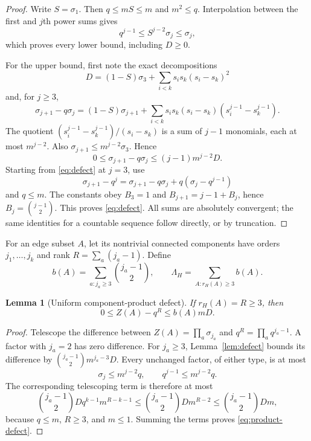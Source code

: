 \documentclass[11pt]{article}
\newtheorem{lemma}[theorem]{Lemma}
\begin{document}
\begin{proof}
Write $S=\sigma_1$.  Then $q\leq mS\leq m$ and $m^2\leq q$.
Interpolation between the first and $j$th power sums gives
\[
 q^{j-1}\leq S^{j-2}\sigma_j\leq\sigma_j,
\]
which proves every lower bound, including $D\geq0$.

For the upper bound, first note the exact decompositions
\[
 D=(1-S)\sigma_3+
 \sum_{i<k}s_i s_k(s_i-s_k)^2
\]
and, for $j\geq3$,
\[
 \sigma_{j+1}-q\sigma_j
 =(1-S)\sigma_{j+1}
 +\sum_{i<k}s_i s_k(s_i-s_k)
       (s_i^{j-1}-s_k^{j-1}).
\]
The quotient
$(s_i^{j-1}-s_k^{j-1})/(s_i-s_k)$ is a sum of $j-1$
monomials, each at most $m^{j-2}$.  Also
$\sigma_{j+1}\leq m^{j-2}\sigma_3$.  Hence
\begin{equation}
 0\leq\sigma_{j+1}-q\sigma_j
 \leq(j-1)m^{j-2}D.
 \label{eq:recurrence}
\end{equation}
Starting from \eqref{eq:defect} at $j=3$, use
\[
 \sigma_{j+1}-q^j
 =\sigma_{j+1}-q\sigma_j
  +q(\sigma_j-q^{j-1})
\]
and $q\leq m$.  The constants obey
$B_3=1$ and $B_{j+1}=j-1+B_j$, hence
$B_j=\binom{j-1}{2}$.  This proves \eqref{eq:defect}.
All sums are absolutely convergent; the same identities for a countable
sequence follow directly, or by truncation.
\end{proof}

For an edge subset $A$, let its nontrivial connected components have orders
$j_1,\ldots,j_k$ and rank $R=\sum_a(j_a-1)$.  Define
\[
 b(A)=\sum_{a:j_a\geq3}\binom{j_a-1}{2},
 \qquad
 \Lambda_H=\sum_{A:r_H(A)\geq3}b(A).
\]

\begin{lemma}[Uniform component-product defect]\label{lem:product-defect}
If $r_H(A)=R\geq3$, then
\begin{equation}
 0\leq Z(A)-q^R\leq b(A)mD.
 \label{eq:product-defect}
\end{equation}
\end{lemma}

\begin{proof}
Telescope the difference between
$Z(A)=\prod_a\sigma_{j_a}$ and
$q^R=\prod_a q^{j_a-1}$.  A factor with $j_a=2$ has zero difference.  For
$j_a\geq3$, Lemma~\ref{lem:defect} bounds its difference by
$\binom{j_a-1}{2}m^{j_a-3}D$.  Every unchanged factor, of either type,
is at most
\[
 \sigma_j\leq m^{j-2}q,
 \qquad q^{j-1}\leq m^{j-2}q.
\]
The corresponding telescoping term is therefore at most
\[
 \binom{j_a-1}{2}
 Dq^{k-1}m^{R-k-1}
 \leq \binom{j_a-1}{2}Dm^{R-2}
 \leq \binom{j_a-1}{2}Dm,
\]
because $q\leq m$, $R\geq3$, and $m\leq1$.  Summing the terms proves
\eqref{eq:product-defect}.
\end{proof}
\end{document}

